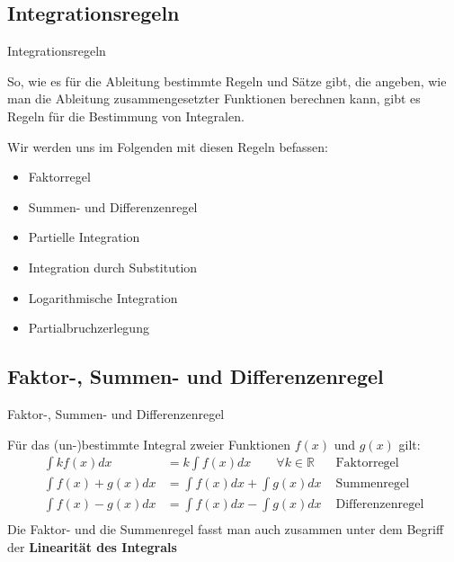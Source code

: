 \subsection{Integrationsregeln}

\begin{frame}{Integrationsregeln}
	\begin{bemerkung}
		So, wie es für die Ableitung bestimmte Regeln und Sätze gibt, die angeben, wie man die Ableitung zusammengesetzter Funktionen berechnen kann, gibt es Regeln für die Bestimmung von Integralen. 
		
			Wir werden uns im Folgenden mit diesen Regeln befassen:
			\begin{itemize}
				\item Faktorregel
				\item Summen- und Differenzenregel
				\item Partielle Integration
				\item Integration durch Substitution
				\item Logarithmische Integration
				\item Partialbruchzerlegung
			\end{itemize}
	\end{bemerkung}
\end{frame}

\subsection{Faktor-, Summen- und Differenzenregel}
\begin{frame}{Faktor-, Summen- und Differenzenregel}
	\begin{theorem}
		Für das (un-)bestimmte Integral zweier Funktionen $f(x)$ und $g(x)$ gilt:
		\begin{align*}
			\int k f(x) dx & = k \int f(x) dx \qquad \forall k \in \mathbb{R} & \text{  Faktorregel} \\
			\int f(x) + g(x) dx & = \int f(x) dx + \int g(x) dx & \text{  Summenregel}\\
			\int f(x) - g(x) dx & = \int f(x) dx - \int g(x) dx & \text{  Differenzenregel}\\
		\end{align*}
		Die Faktor- und die Summenregel fasst man auch zusammen unter dem Begriff der \textbf{Linearität des Integrals}
	\end{theorem}
\end{frame}

